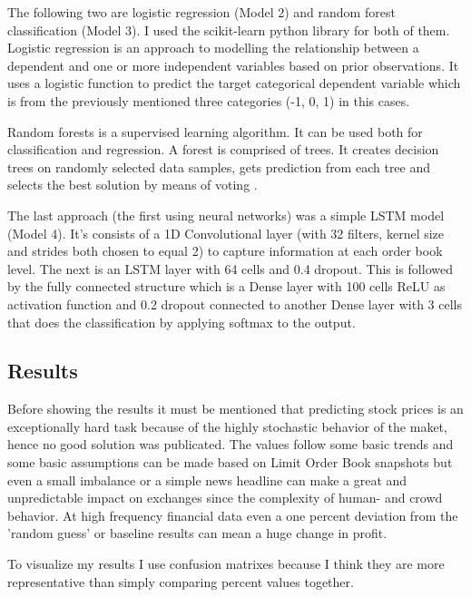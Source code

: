 \documentclass[11pt,a4paper,oneside]{article}
\begin{document}
The following two are logistic regression (Model 2) and random forest classification (Model 3). I used the scikit-learn 
python library for both of them. Logistic regression is an approach to modelling the relationship between a dependent 
and one or more independent variables based on prior observations. It uses a logistic function to predict the target 
categorical dependent variable which is from the previously mentioned three categories (-1, 0, 1) in this cases.

Random forests is a supervised learning algorithm. It can be used both for classification and regression. A forest is 
comprised of trees. It creates decision trees on randomly selected data samples, gets prediction from each tree and 
selects the best solution by means of voting \cite{randomforest}.

The last approach (the first using neural networks) was a simple LSTM model (Model 4). It's consists of a 1D 
Convolutional layer (with 32 filters, kernel size and strides both chosen to equal 2) to capture information at each 
order book level. The next is an LSTM layer with 64 cells and 0.4 dropout. This is followed by the fully connected 
structure which is a Dense layer with 100 cells ReLU as activation function and 0.2 dropout connected to another Dense 
layer with 3 cells that does the classification by applying softmax to the output.

\subsection{Results}
\label{sec:results}

Before showing the results it must be mentioned that predicting stock prices is an exceptionally hard task because of 
the highly stochastic behavior of the maket, hence no good solution was publicated. The values follow some basic trends 
and some basic assumptions can be made based on Limit Order Book snapshots but even a small imbalance or a simple news 
headline can make a great and unpredictable impact on exchanges since the complexity of human- and crowd behavior. At 
high frequency financial data even a one percent deviation from the 'random guess' or baseline results can mean a huge 
change in profit. 

To visualize my results I use confusion matrixes because I think they are more representative than simply comparing 
percent values together.
\end{document}

